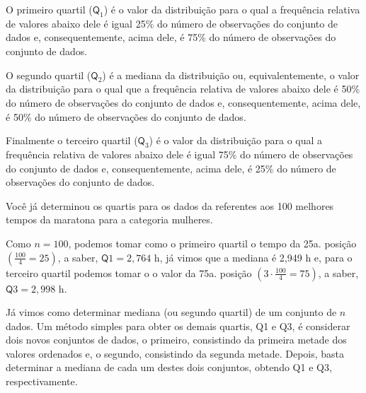 O primeiro quartil (\(\textsf{Q}_1\)) é o valor da distribuição para o qual a frequência relativa de valores abaixo dele é igual 25\% do número de observações do conjunto de dados e, consequentemente, acima dele, é 75\% do número de observações do conjunto de dados.

O segundo quartil (\(\textsf{Q}_2\)) é a mediana da distribuição ou, equivalentemente, o  valor da distribuição para o qual que a frequência relativa de valores abaixo dele é 50\% do número de observações do conjunto de dados e, consequentemente, acima dele, é 50\% do número de observações do conjunto de dados.

Finalmente o terceiro quartil (\(\textsf{Q}_3\)) é o valor da distribuição
para o qual a frequência relativa de valores abaixo dele é igual 75\% do número de observações do conjunto de dados e, consequentemente, acima dele, é 25\% do número de observações do conjunto de dados.

Você já determinou os quartis para os dados da  referentes aos 100 melhores tempos da maratona para a categoria mulheres.

Como \(n=100\), podemos tomar como o primeiro quartil o tempo da 25a. posição \(\left (\frac{100}{4}=25\right )\), a saber, \(\textsf{Q}1=2,764\) h, já vimos que a mediana é 2,949 h e, para o terceiro quartil podemos tomar o  o valor da 75a. posição \(\left (3\cdot\frac{100}{4}=75\right )\), a saber, \(\textsf{Q}3=2,998\) h.

Já vimos como determinar mediana (ou segundo quartil) de um conjunto de \(n\) dados. Um método simples para obter os demais quartis, Q1 e Q3, é considerar dois novos conjuntos de dados, o primeiro, consistindo da primeira metade dos valores ordenados e, o segundo, consistindo da segunda metade. Depois, basta determinar a mediana de cada um destes dois conjuntos, obtendo Q1 e Q3, respectivamente.


